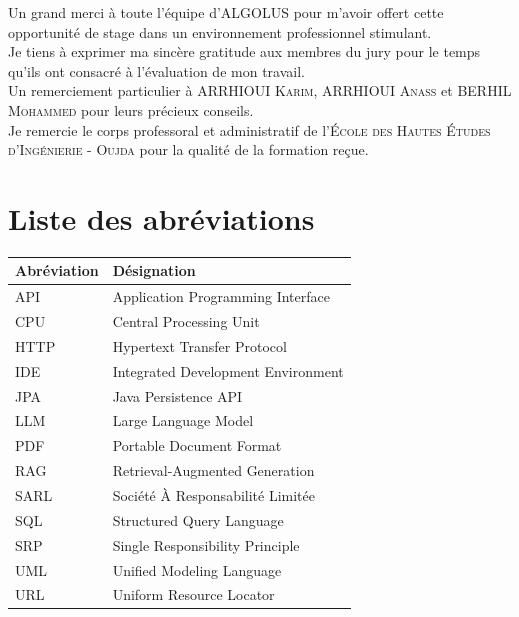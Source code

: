 \documentclass[12pt,a4paper]{report}
\begin{document}
	Un grand merci à toute l'équipe d'\textsc{ALGOLUS} pour m'avoir offert cette opportunité de stage dans un environnement professionnel stimulant.\\[0.6em]
	
	Je tiens à exprimer ma sincère gratitude aux membres du jury pour le temps qu’ils ont consacré à l’évaluation de mon travail.\\[0.6em]
	
	Un remerciement particulier à \textsc{ARRHIOUI Karim}, \textsc{ARRHIOUI Anass} et \textsc{BERHIL Mohammed} pour leurs précieux conseils.\\[0.6em]
			
	Je remercie le corps professoral et administratif de l'\textsc{École des Hautes Études d'Ingénierie - Oujda} pour la qualité de la formation reçue.
	
	
	\chapter*{Liste des abréviations}
	
	\begin{table}[H]
		\centering
		\begin{tabular}{|l|l|}
			\hline
			\textbf{Abréviation} & \textbf{Désignation} \\
			\hline
			API & Application Programming Interface \\
			\hline
			CPU & Central Processing Unit \\
			\hline
			HTTP & Hypertext Transfer Protocol \\
			\hline
			IDE & Integrated Development Environment \\
			\hline
			JPA & Java Persistence API \\
			\hline
			LLM & Large Language Model \\
			\hline
			PDF & Portable Document Format \\
			\hline
			RAG & Retrieval-Augmented Generation \\
			\hline
			SARL & Société À Responsabilité Limitée \\
			\hline
			SQL & Structured Query Language \\
			\hline
			SRP & Single Responsibility Principle \\
			\hline
			UML & Unified Modeling Language \\
			\hline
			URL & Uniform Resource Locator \\
			\hline
		\end{tabular}
		\label{tab:liste-abréviations}
	\end{table}
	
\end{document}
